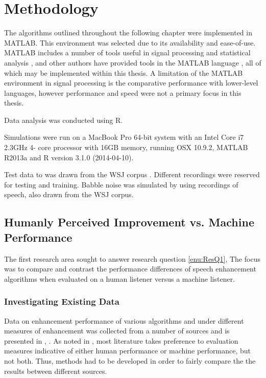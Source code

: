 %

\chapter{Methodology}

\acresetall

The algorithms outlined throughout the following chapter were implemented
in MATLAB. This environment was selected due to its availability and
ease-of-use. MATLAB includes a number of tools useful in signal processing
and statistical analysis \citep{Krauss1994,Jones1997}, and other
authors have provided tools in the MATLAB language \citep{Hoyer2004,Brookes1997,Loizou2008},
all of which may be implemented within this thesis. A limitation of
the MATLAB environment in signal processing is the comparative performance
with lower-level languages, however performance and speed were not
a primary focus in this thesis.

Data analysis was conducted using R.

Simulations were run on a MacBook Pro 64-bit system with an Intel
Core i7 2.3GHz 4- core processor with 16GB memory, running OSX 10.9.2,
MATLAB R2013a and R version 3.1.0 (2014-04-10).

Test data to was drawn from the \ac{WSJ} corpus \citep{Robinson1995}.
Different recordings were reserved for testing and training. Babble
noise was simulated by using recordings of speech, also drawn from
the \ac{WSJ} corpus.


\section{Humanly Perceived Improvement vs. Machine Performance}

The first research area sought to answer research question \vref{enu:ResQ1},
\textit{\RQone{}} The focus was to compare and contrast the performance
differences of speech enhancement algorithms when evaluated on a human
listener versus a machine listener.


\subsection{\label{sub:Method-Existing-Data}Investigating Existing Data}

Data on enhancement performance of various algorithms and under different
measures of enhancement was collected from a number of sources \citep{mohammadiha2013supervised,Wilson2008,Schmidt2006,Raj2005,Rennie2008,Weninger2011,Williamson2014,Paliwal2010,Plourde2007}
and is presented in , . As
noted in  \textit{},
most literature takes preference to evaluation measures indicative
of either human performance or machine performance, but not both.
Thus, methods had to be developed in order to fairly compare the the
results between different sources.

